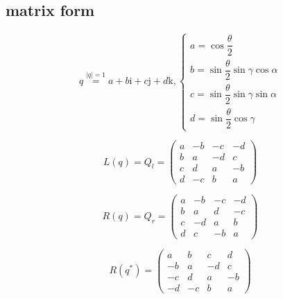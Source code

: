\documentclass[
]{book}
\theoremstyle{definition}
\theoremstyle{definition}
\theoremstyle{definition}
\theoremstyle{definition}
\theoremstyle{remark}
\begin{document}
\subsection{matrix form}\label{matrix-form}

\[
q\overset{\left|q\right|=1}{=}a+b\mathrm{i}+c\mathrm{j}+d\mathrm{k},\begin{cases}
a=\cos\dfrac{\theta}{2}\\
b=\sin\dfrac{\theta}{2}\sin\gamma\cos\alpha\\
c=\sin\dfrac{\theta}{2}\sin\gamma\sin\alpha\\
d=\sin\dfrac{\theta}{2}\cos\gamma
\end{cases}
\]

\[
L\left(q\right)=Q_{{\scriptscriptstyle l}}=\begin{pmatrix}a & -b & -c & -d\\
b & a & -d & c\\
c & d & a & -b\\
d & -c & b & a
\end{pmatrix}
\]

\[
R\left(q\right)=Q_{{\scriptscriptstyle r}}=\begin{pmatrix}a & -b & -c & -d\\
b & a & d & -c\\
c & -d & a & b\\
d & c & -b & a
\end{pmatrix}
\]

\[
R\left(q^{*}\right)=\begin{pmatrix}a & b & c & d\\
-b & a & -d & c\\
-c & d & a & -b\\
-d & -c & b & a
\end{pmatrix}
\]
\end{document}

